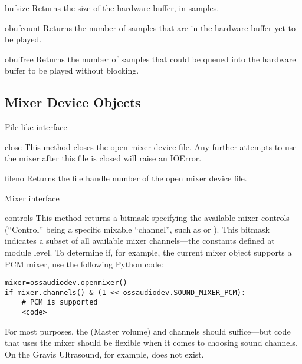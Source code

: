 \begin{methoddesc}{bufsize}{}
Returns the size of the hardware buffer, in samples.
\end{methoddesc}

\begin{methoddesc}{obufcount}{}
Returns the number of samples that are in the hardware buffer yet to be
played.
\end{methoddesc}

\begin{methoddesc}{obuffree}{}
Returns the number of samples that could be queued into the hardware
buffer to be played without blocking.
\end{methoddesc}

\subsection{Mixer Device Objects \label{mixer-device-objects}}

File-like interface

\begin{methoddesc}{close}{}
This method closes the open mixer device file.  Any further attempts to
use the mixer after this file is closed will raise an IOError.
\end{methoddesc}

\begin{methoddesc}{fileno}{}
Returns the file handle number of the open mixer device file.
\end{methoddesc}

Mixer interface

\begin{methoddesc}{controls}{}
This method returns a bitmask specifying the available mixer controls
(``Control'' being a specific mixable ``channel'', such as
 or ).  This
bitmask indicates a subset of all available mixer channels---the
 constants defined at module level.  To determine if,
for example, the current mixer object supports a PCM mixer, use the
following Python code:

\begin{verbatim}
mixer=ossaudiodev.openmixer()
if mixer.channels() & (1 << ossaudiodev.SOUND_MIXER_PCM):
	# PCM is supported
	<code>
\end{verbatim}

For most purposes, the  (Master volume) and
 channels should suffice---but code that uses the
mixer should be flexible when it comes to choosing sound channels.  On
the Gravis Ultrasound, for example,  does not
exist.
\end{methoddesc}

